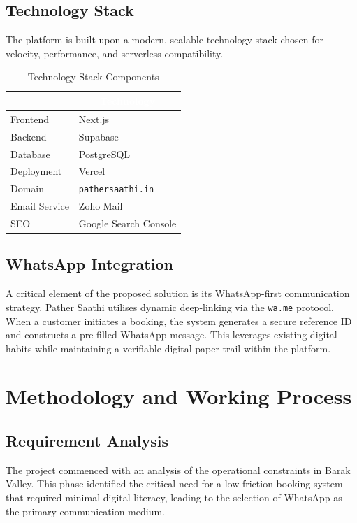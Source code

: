 \documentclass[12pt, a4paper, oneside]{report}
\begin{document}
\section{Technology Stack}
The platform is built upon a modern, scalable technology stack chosen for velocity, performance, and serverless compatibility.

\begin{table}[htbp]
    \centering
    \caption{Technology Stack Components}
    \renewcommand{\arraystretch}{1.5}
    \begin{tabularx}{\textwidth}{l X}
    \toprule
    \rowcolor{brandteal}
    \multicolumn{1}{c}{\textcolor{white}{\textbf{Component}}} & \multicolumn{1}{c}{\textcolor{white}{\textbf{Technology}}} \\
    \midrule
    \rowcolor{lightgray!30}
    Frontend & Next.js \\
    Backend & Supabase \\
    \rowcolor{lightgray!30}
    Database & PostgreSQL \\
    Deployment & Vercel \\
    \rowcolor{lightgray!30}
    Domain & \texttt{pathersaathi.in} \\
    Email Service & Zoho Mail \\
    \rowcolor{lightgray!30}
    SEO & Google Search Console \\
    \bottomrule
    \end{tabularx}
\end{table}

\section{WhatsApp Integration}
A critical element of the proposed solution is its WhatsApp-first communication strategy. Pather Saathi utilises dynamic deep-linking via the \texttt{wa.me} protocol. When a customer initiates a booking, the system generates a secure reference ID and constructs a pre-filled WhatsApp message. This leverages existing digital habits while maintaining a verifiable digital paper trail within the platform.

\chapter{Methodology and Working Process}

\section{Requirement Analysis}
The project commenced with an analysis of the operational constraints in Barak Valley. This phase identified the critical need for a low-friction booking system that required minimal digital literacy, leading to the selection of WhatsApp as the primary communication medium.
\end{document}

